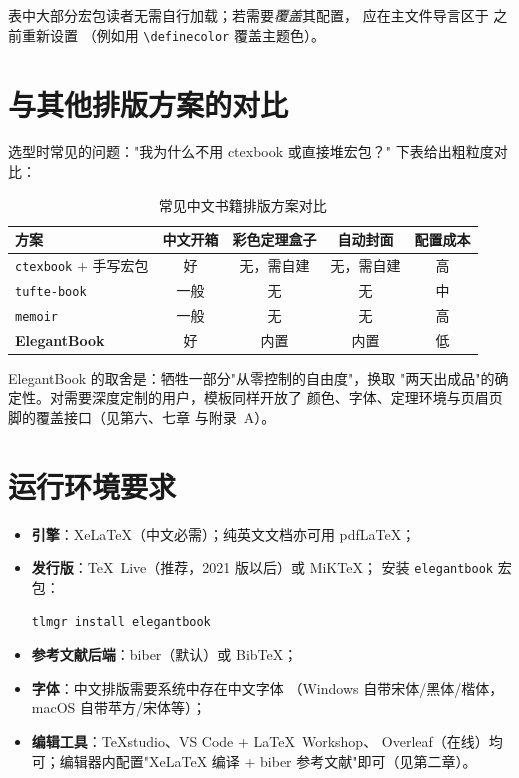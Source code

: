 \begin{remark}
表中大部分宏包读者无需自行加载；若需要\emph{覆盖}其配置，
应在主文件导言区于 \verb|| 之前重新设置
（例如用 \verb|\definecolor| 覆盖主题色）。
\end{remark}

\section{与其他排版方案的对比}

选型时常见的问题："我为什么不用 ctexbook 或直接堆宏包？"
下表给出粗粒度对比：

\begin{table}[htbp]
  \centering
  \caption{常见中文书籍排版方案对比}\label{tab:compare}
  \begin{tabular}{lcccc}
    \toprule
    方案 & 中文开箱 & 彩色定理盒子 & 自动封面 & 配置成本 \\
    \midrule
    \texttt{ctexbook} + 手写宏包 & 好 & 无，需自建 & 无，需自建 & 高 \\
    \texttt{tufte-book} & 一般 & 无 & 无 & 中 \\
    \texttt{memoir} & 一般 & 无 & 无 & 高 \\
    \textbf{ElegantBook} & 好 & 内置 & 内置 & 低 \\
    \bottomrule
  \end{tabular}
\end{table}

ElegantBook 的取舍是：牺牲一部分"从零控制的自由度"，换取
"两天出成品"的确定性。对需要深度定制的用户，模板同样开放了
颜色、字体、定理环境与页眉页脚的覆盖接口（见第六、七章
与附录~A）。

\section{运行环境要求}

\begin{itemize}
  \item \textbf{引擎}：XeLaTeX（中文必需）；纯英文文档亦可用
        pdfLaTeX；
  \item \textbf{发行版}：TeX~Live（推荐，2021 版以后）或 MiKTeX；
        安装 \texttt{elegantbook} 宏包：
\begin{lstlisting}
tlmgr install elegantbook
\end{lstlisting}
  \item \textbf{参考文献后端}：biber（默认）或 BibTeX；
  \item \textbf{字体}：中文排版需要系统中存在中文字体
        （Windows 自带宋体/黑体/楷体，macOS 自带苹方/宋体等）；
  \item \textbf{编辑工具}：TeXstudio、VS Code + LaTeX~Workshop、
        Overleaf（在线）均可；编辑器内配置"XeLaTeX 编译 +
        biber 参考文献"即可（见第二章）。
\end{itemize}
